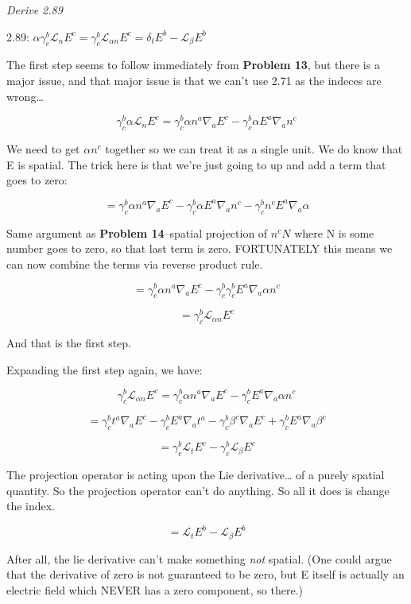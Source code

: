 \documentclass[landscape,letterpaper,10pt,english]{article}
\begin{document}
\[\label{P15}\]

\emph{Derive 2.89}

2.89:
\(\alpha \gamma^b_c \mathcal{L}_n E^c = \gamma^b_c \mathcal{L}_{\alpha n} E^c = \delta_t E^b - \mathcal{L}_\beta E^b\)

    The first step seems to follow immediately from \textbf{Problem 13}, but
there is a major issue, and that major issue is that we can't use 2.71
as the indeces are wrong\ldots{}

\[\gamma^b_c \alpha \mathcal{L}_n E^c = \gamma^b_c \alpha n^a \nabla_a E^c - \gamma^b_c \alpha E^a \nabla_a n^c\]

We need to get \(\alpha n^c\) together so we can treat it as a single
unit. We do know that E is spatial. The trick here is that we're just
going to up and add a term that goes to zero:

\[ = \gamma^b_c \alpha n^a \nabla_a E^c - \gamma^b_c \alpha E^a \nabla_a n^c - \gamma^b_c n^c E^a \nabla_a \alpha \]

Same argument as \textbf{Problem 14}--spatial projection of \(n^c N\)
where N is some number goes to zero, so that last term is zero.
FORTUNATELY this means we can now combine the terms via reverse product
rule.

\[ = \gamma^b_c \alpha n^a \nabla_a E^c - \gamma^b_c \gamma^b_c E^a \nabla_a \alpha n^c \]

\[ = \gamma^b_c \mathcal{L}_{\alpha n} E^c \]

And that is the first step.

    Expanding the first step again, we have:

\[\gamma^b_c \mathcal{L}_{\alpha n} E^c =  \gamma^b_c \alpha n^a \nabla_a E^c - \gamma^b_c E^a \nabla_a \alpha n^c\]

\[ =  \gamma^b_c t^a \nabla_a E^c - \gamma^b_c E^a \nabla_a t^a - \gamma^b_c \beta^c \nabla_a E^c + \gamma^b_c E^a \nabla_a \beta^c\]

\[ =  \gamma^b_c \mathcal{L}_t E^c - \gamma^b_c \mathcal{L}_\beta E^c\]

The projection operator is acting upon the Lie derivative\ldots{} of a
purely spatial quantity. So the projection operator can't do anything.
So all it does is change the index.

\[ = \mathcal{L}_t E^b - \mathcal{L}_\beta E^b\]

After all, the lie derivative can't make something \emph{not} spatial.
(One could argue that the derivative of zero is not guaranteed to be
zero, but E itself is actually an electric field which NEVER has a zero
component, so there.)
\end{document}
